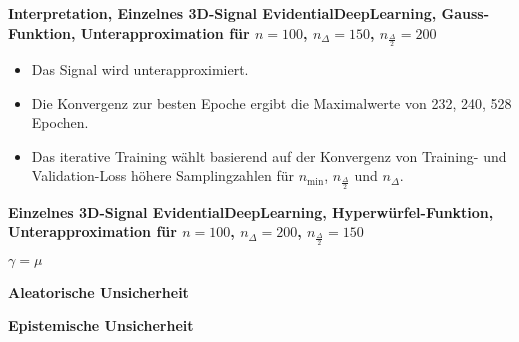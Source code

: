 \begin{otherlanguage}{ngerman}
\begin{samepage}
\begin{minipage}{\textwidth}

\noindent\textbf{Interpretation, Einzelnes 3D-Signal \gls{EvidentialDeepLearning}, Gauss-Funktion,
Unterapproximation für $n=100$, $n_{\Delta}=150$, $n_{\frac{\Delta}{2}}=200$}

\begin{itemize}
    \item Das Signal wird unterapproximiert.
    \item Die Konvergenz zur besten Epoche ergibt die Maximalwerte von 232, 240, 528 Epochen.
    \item Das iterative Training wählt basierend auf der Konvergenz von Training- und Validation-Loss höhere Samplingzahlen für $n_{\min}$, $n_{\frac{\Delta}{2}}$ und $n_{\Delta}$.
\end{itemize}




\end{minipage}
\end{samepage}





\begin{samepage}
\begin{minipage}{\textwidth}

\noindent\textbf{Einzelnes 3D-Signal \gls{EvidentialDeepLearning}, Hyperwürfel-Funktion,
Unterapproximation für $n=100$, $n_{\Delta}=200$, $n_{\frac{\Delta}{2}}=150$}


\begin{minipage}{0.05\textwidth}\vspace{0.5cm}\end{minipage}%
\begin{minipage}{0.3\textwidth}\centering \textbf{$\gamma=\mu$}\end{minipage}%
\begin{minipage}{0.3\textwidth}\centering \textbf{Aleatorische Unsicherheit}\end{minipage}%
\begin{minipage}{0.3\textwidth}\centering \textbf{Epistemische Unsicherheit}\end{minipage}


\end{minipage}
\end{samepage}
\end{otherlanguage}
